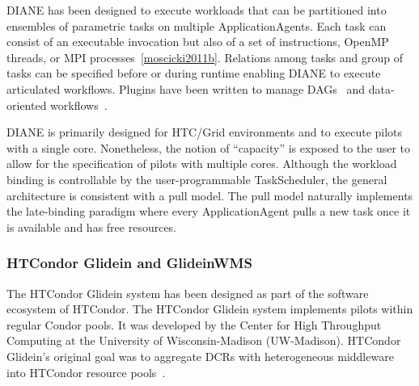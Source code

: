 \documentclass{sig-alternate}
\begin{document}
DIANE has been designed to execute workloads that can be partitioned into
ensembles of parametric tasks on multiple ApplicationAgents. Each task can
consist of an executable invocation but also of a set of instructions, OpenMP
threads, or MPI processes~\ref{moscicki2011b}. Relations among tasks and group
of tasks can be specified before or during runtime enabling DIANE to execute
articulated workflows. Plugins have been written to manage
DAGs~\cite{grzeslo2009} and data-oriented workflows~\cite{glatard2008}.

DIANE is primarily designed for HTC/Grid environments and to execute pilots with
a single core. Nonetheless, the notion of ``capacity'' is exposed to the user to
allow for the specification of pilots with multiple cores. Although the workload
binding is controllable by the user-programmable TaskScheduler, the general
architecture is consistent with a pull model. The pull model naturally
implements the late-binding paradigm where every ApplicationAgent pulls a new
task once it is available and has free resources.

%
\subsubsection{HTCondor Glidein and GlideinWMS}
\label{sec:glidein}

The HTCondor Glidein system has been designed as part of the software ecosystem
of HTCondor. The HTCondor Glidein system implements pilots within regular Condor
pools. It was developed by the Center for High Throughput Computing at the
University of Wisconsin-Madison (UW-Madison). HTCondor Glidein's original goal
was to aggregate DCRs with heterogeneous middleware into HTCondor resource
pools~\cite{glidein_manual_url}.
\end{document}
